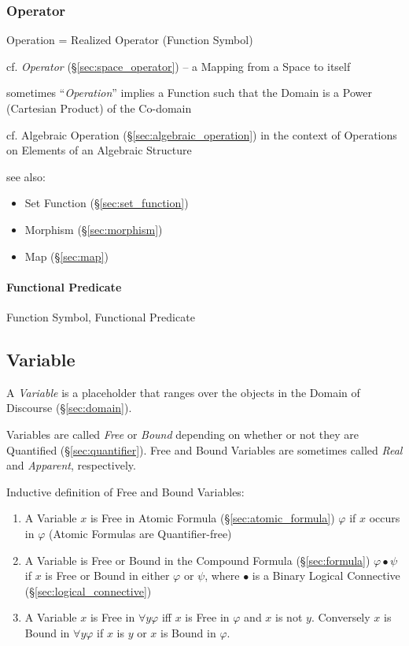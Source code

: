 \subsubsection{Operator}\label{sec:operator}

Operation = Realized Operator (Function Symbol)

\fist cf. \emph{Operator} (\S\ref{sec:space_operator}) -- a Mapping from a Space
to itself

sometimes ``\emph{Operation}'' implies a Function such that the Domain is a
Power (Cartesian Product) of the Co-domain

cf. Algebraic Operation (\S\ref{sec:algebraic_operation}) in the context of
Operations on Elements of an Algebraic Structure

see also:
\begin{itemize}
  \item Set Function (\S\ref{sec:set_function})
  \item Morphism (\S\ref{sec:morphism})
  \item Map (\S\ref{sec:map})
\end{itemize}



\paragraph{Functional Predicate}\label{sec:functional_predicate}\hfill

Function Symbol, Functional Predicate



\subsection{Variable}\label{sec:variable}

A \emph{Variable} is a placeholder that ranges over the objects in the
Domain of Discourse (\S\ref{sec:domain}).

Variables are called \emph{Free} or \emph{Bound} depending on whether
or not they are Quantified (\S\ref{sec:quantifier}). Free and Bound
Variables are sometimes called \emph{Real} and \emph{Apparent},
respectively.

Inductive definition of Free and Bound Variables:
\begin{enumerate}
\item A Variable $x$ is Free in Atomic Formula
  (\S\ref{sec:atomic_formula}) $\varphi$ if $x$ occurs in $\varphi$
  (Atomic Formulas are Quantifier-free)
\item A Variable is Free or Bound in the Compound Formula
  (\S\ref{sec:formula}) $\varphi \bullet \psi$ if $x$ is Free or Bound
  in either $\varphi$ or $\psi$, where $\bullet$ is a Binary Logical
  Connective (\S\ref{sec:logical_connective})
\item A Variable $x$ is Free in $\forall y \varphi$ iff $x$ is Free in
  $\varphi$ and $x$ is not $y$. Conversely $x$ is Bound in $\forall y
  \varphi$ if $x$ is $y$ or $x$ is Bound in $\varphi$.
\end{enumerate}

